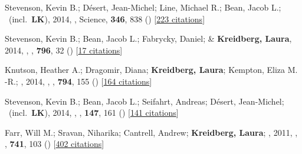 \item[{\color{numcolor}\scriptsize5}] Stevenson, Kevin B.; D{\'e}sert, Jean-Michel; Line, Michael R.; Bean, Jacob L.; \etal\ (incl.\ \textbf{LK}), 2014, , Science, \textbf{346}, 838 () [\href{https://ui.adsabs.harvard.edu/abs/2014Sci...346..838S}{223 citations}]

\item[{\color{numcolor}\scriptsize4}] Stevenson, Kevin B.; Bean, Jacob L.; Fabrycky, Daniel; \& \textbf{Kreidberg, Laura}, 2014, , \apj, \textbf{796}, 32 () [\href{https://ui.adsabs.harvard.edu/abs/2014ApJ...796...32S}{17 citations}]

\item[{\color{numcolor}\scriptsize3}] Knutson, Heather A.; Dragomir, Diana; \textbf{Kreidberg, Laura}; Kempton, Eliza M. -R.; \etal, 2014, , \apj, \textbf{794}, 155 () [\href{https://ui.adsabs.harvard.edu/abs/2014ApJ...794..155K}{164 citations}]

\item[{\color{numcolor}\scriptsize2}] Stevenson, Kevin B.; Bean, Jacob L.; Seifahrt, Andreas; D{\'e}sert, Jean-Michel; \etal\ (incl.\ \textbf{LK}), 2014, , \aj, \textbf{147}, 161 () [\href{https://ui.adsabs.harvard.edu/abs/2014AJ....147..161S}{141 citations}]

\item[{\color{numcolor}\scriptsize1}] Farr, Will M.; Sravan, Niharika; Cantrell, Andrew; \textbf{Kreidberg, Laura}; \etal, 2011, , \apj, \textbf{741}, 103 () [\href{https://ui.adsabs.harvard.edu/abs/2011ApJ...741..103F}{402 citations}]